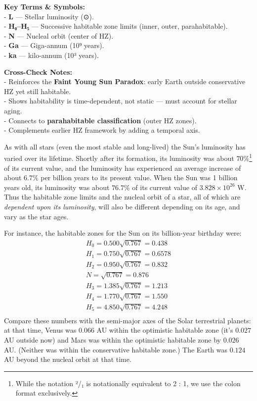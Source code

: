 \documentclass[
  letterpaper,
]{book}
\begin{document}
\textbf{Key Terms \& Symbols:}\\
- \textbf{L} --- Stellar luminosity (⊙).\\
- \textbf{H₀--H₅} --- Successive habitable zone limits (inner, outer,
parahabitable).\\
- \textbf{N} --- Nucleal orbit (center of HZ).\\
- \textbf{Ga} --- Giga-annum (10⁹ years).\\
- \textbf{ka} --- kilo-annum (10³ years).

\textbf{Cross-Check Notes:}\\
- Reinforces the \textbf{Faint Young Sun Paradox}: early Earth outside
conservative HZ yet still habitable.\\
- Shows habitability is time-dependent, not static --- must account for
stellar aging.\\
- Connects to \textbf{parahabitable classification} (outer HZ zones).\\
- Complements earlier HZ framework by adding a temporal axis.

As with all stars (even the most stable and long-lived) the Sun's
luminosity has varied over its lifetime. Shortly after its formation,
its luminosity was about \(70\%\)\footnote{While the notation ²/₁ is
  notationally equivalent to 2 : 1, we use the colon format exclusively.}
of its current value, and the luminosity has experienced an average
increase of about \(6.7\%\) per billion years to its present value. When
the Sun was 1 billion years old, its luminosity was about \(76.7\)\% of
its current value of \(3.828 \times 10^{26}\) W. Thus the habitable zone
limits and the nucleal orbit of a star, all of which are \emph{dependent
upon its luminosity}, will also be different depending on its age, and
vary as the star ages.

For instance, the habitable zones for the Sun on its billion-year
birthday were: \[
\begin{align}
H_0 = 0.500\sqrt{0.767} = 0.438 \\
H_1 = 0.750\sqrt{0.767} = 0.6578 \\
H_2 = 0.950\sqrt{0.767} = 0.832 \\
N = \sqrt{0.767} = 0.876 \\
H_3 = 1.385\sqrt{0.767} = 1.213 \\
H_4 = 1.770\sqrt{0.767} = 1.550 \\
H_5 = 4.850\sqrt{0.767} = 4.248 \\
\end{align}
\] Compare these numbers with the semi-major axes of the Solar
terrestrial planets: at that time, Venus was 0.066 AU within the
optimistic habitable zone (it's \(0.027\) AU outside now) and Mars was
within the optimistic habitable zone by \(0.026\) AU. (Neither was
within the conservative habitable zone.) The Earth was \(0.124\) AU
beyond the nucleal orbit at that time.
\end{document}
